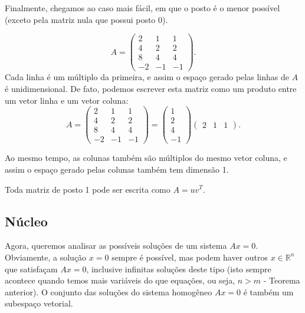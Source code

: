 \begin{exemplo}
Finalmente, chegamos ao caso mais fácil, em que o posto é o menor possível (exceto pela matriz nula que possui posto 0). 
\begin{exemplo}
   \begin{equation*}
      A=
      \begin{pmatrix}
         2 & 1 & 1\\
         4 & 2 & 2\\
         8 & 4& 4\\
         -2 & -1 & -1
      \end{pmatrix}.
   \end{equation*}
   Cada linha é um múltiplo da primeira, e assim o espaço gerado pelas linhas de $A$ é unidimensional. De fato, podemos escrever esta matriz como um produto entre um vetor linha e um vetor coluna:
   \begin{equation*}
      A=
      \begin{pmatrix}
         2 & 1 & 1\\
         4 & 2 & 2\\
         8 & 4& 4\\
         -2 & -1 & -1
      \end{pmatrix}
      =
      \begin{pmatrix}
         1\\
         2\\
         4\\
         -1
      \end{pmatrix}
      \begin{pmatrix}
         2 &  1 &  1
      \end{pmatrix}.
   \end{equation*}
\end{exemplo}
Ao mesmo tempo, as colunas também são múltiplos do mesmo vetor coluna, e assim o espaço gerado pelas colunas também tem dimensão 1.
\end{exemplo}

\begin{teo}
	Toda matriz de posto 1 pode ser escrita como $A=uv^T$.
\end{teo}

\subsection*{Núcleo}

Agora, queremos analisar as possíveis soluções de um sistema $Ax=0$. Obviamente, a solução $x=0$ sempre é possível, mas podem haver outros $x\in {\mathbb{R}}^n$ que satisfaçam $Ax=0$, inclusive infinitas soluções deste tipo (isto sempre acontece quando temos mais variáveis do que equações, ou seja, $n>m$ - Teorema anterior). O conjunto das soluções do sistema homogêneo $Ax=0$ é também um subespaço vetorial.

